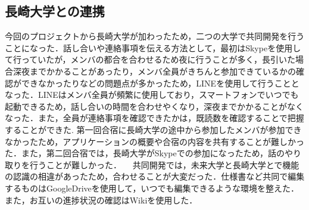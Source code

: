 \subsection{長崎大学との連携}
 今回のプロジェクトから長崎大学が加わったため，二つの大学で共同開発を行うことになった．話し合いや連絡事項を伝える方法として，最初はSkypeを使用して行っていたが，メンバの都合を合わせるため夜に行うことが多く，長引いた場合深夜までかかることがあったり，メンバ全員がきちんと参加できているかの確認ができなかったりなどの問題点が多かったため，LINEを使用して行うこととなった．LINEはメンバ全員が頻繁に使用しており，スマートフォンでいつでも起動できるため，話し合いの時間を合わせやくなり，深夜までかかることがなくなった．また，全員が連絡事項を確認できたかは，既読数を確認することで把握することができた.
 第一回合宿に長崎大学の途中から参加したメンバが参加できなかったため，アプリケーションの概要や合宿の内容を共有することが難しかった．また，第二回合宿では，長崎大学がSkypeでの参加になったため，話のやり取りを行うことが難しかった．
　共同開発では，未来大学と長崎大学とで機能の認識の相違があったため，合わせることが大変だった．仕様書など共同で編集するものはGoogleDriveを使用して，いつでも編集できるような環境を整えた．また，お互いの進捗状況の確認はWikiを使用した．
